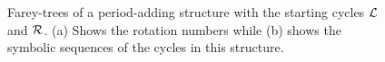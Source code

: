\begin{figure}
{		\label{fig:state.discont.adding.farey.rot}
	}
	\quad
	\caption[Farey-trees of a period-adding structure between $\L$ and $\R$]{
		Farey-trees of a period-adding structure with the starting cycles $\L$ and $\R$.
		(a) Shows the rotation numbers while (b) shows the symbolic sequences of the cycles in this structure.
	}
	\label{fig:state.discont.adding.farey}
\end{figure}
